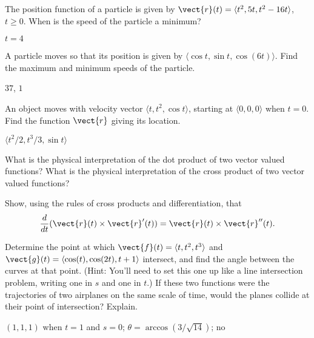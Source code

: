 \begin{enumialphparenastyle}
\begin{ex}
The position function of a particle is given by $\vect{r}(t) =
\langle t^2,5t,t^2-16t\rangle$, $t\geq 0$.  When is the speed of the particle
a minimum?
\begin{sol} $t=4$
\end{sol}
\end{ex}

\begin{ex}
A particle moves so that its position is given by
$\langle \cos t, \sin t, \cos(6t)\rangle$. Find the maximum and
minimum speeds of the particle.
\begin{sol} $37$, $1$
\end{sol}
\end{ex}

\begin{ex}
An object moves with velocity vector $\langle t, t^2,
\cos t\rangle$, starting at $\langle 0,0,0\rangle$ when $t=0$.
 Find the function
$\vect{r}$ giving its location.
\begin{sol} $\langle t^2/2,t^3/3,\sin t\rangle$
\end{sol}
\end{ex}

\begin{ex}
What is the physical interpretation of the dot product of two
  vector valued functions?  What is the physical interpretation of the
  cross product of two vector valued functions?
\end{ex}

\begin{ex}
Show, using the rules of cross products and differentiation,
  that
$${d\over dt} (\vect{r}(t) \times \vect{r}'(t))= 
\vect{r}(t) \times \vect{r}''(t).$$
\end{ex}

\begin{ex}
Determine the point at which $\vect{f}(t)=\langle t, t^2, t^3
\rangle$ and $\vect{g}(t) =\langle \cos(t), \cos(2t), t+1 \rangle$
intersect, and find the angle between the curves at that point.  (Hint:
You'll need to set this one up like a line intersection problem,
writing one in $s$ and one in $t$.) If these two functions were the
trajectories of two airplanes on the same scale of time, would the
planes collide at their point of intersection?  Explain.
\begin{sol} $(1,1,1)$ when $t=1$ and $s=0$; $\theta=\arccos(3/\sqrt{14})$; no
\end{sol}
\end{ex}


\end{enumialphparenastyle}
